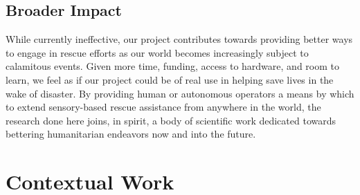 \documentclass{article}
\begin{document}
\subsection{Broader Impact}
While currently ineffective, our project contributes towards providing better ways to engage in rescue efforts as our world becomes increasingly subject to calamitous events. Given more time, funding, access to hardware, and room to learn, we feel as if our project could be of real use in helping save lives in the wake of disaster. By providing human or autonomous operators a means by which to extend sensory-based rescue assistance from anywhere in the world, the research done here joins, in spirit, a body of scientific work dedicated towards bettering humanitarian endeavors now and into the future. 

\section{Contextual Work}
\end{document}
